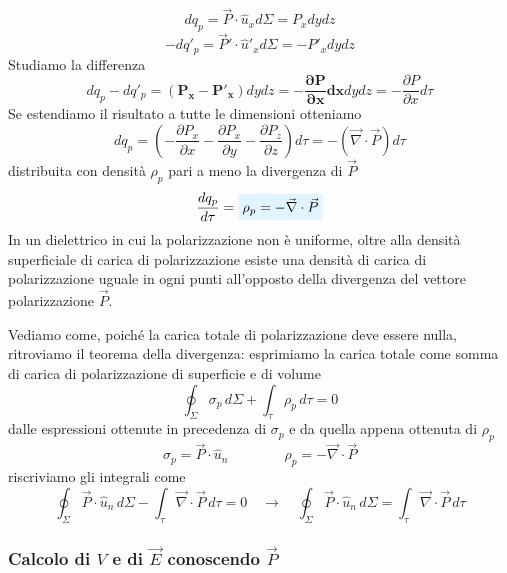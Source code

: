 \documentclass[x11names]{report}
\begin{document}
\begin{figure}[H]
	\centering
\end{figure}

\[
dq_p = \vec{P} \cdot \hat{u}_x d\Sigma = P_x dydz
\]
\[
-dq'_p = \vec{P}'\cdot \hat{u}'_x d\Sigma = -P'_x dydz
\]
Studiamo la differenza
\[
dq_p -dq'_p = \boldsymbol{(P_x - P'_x)}dydz = \boldsymbol{-\frac{\partial P}{\partial x} dx} dy dz = -\frac{\partial P}{\partial x}d\tau
\]
Se estendiamo il risultato a tutte le dimensioni otteniamo 
\[
dq_p = \left(-\frac{\partial P_x}{\partial x}-\frac{\partial P_x}{\partial y}-\frac{\partial P_z}{\partial z}\right)d\tau = -\left(\vec{\nabla}\cdot\vec{P}\right)d\tau
\]
distribuita con densità \(\rho_p\) pari a meno la divergenza di \(\vec{P}\)
\begin{equation}
	 \frac{dq_p}{d\tau} = \viola{\rho_p = -\vec{\nabla}\cdot\vec{P}}
\end{equation}
In un dielettrico in cui la polarizzazione non è uniforme, oltre alla densità superficiale di carica di polarizzazione esiste una densità di carica di polarizzazione uguale in ogni punti all'opposto della divergenza del vettore polarizzazione \(\vec{P}\).

Vediamo come, poiché la carica totale di polarizzazione deve essere nulla, ritroviamo il teorema della divergenza: esprimiamo la carica totale come somma di carica di polarizzazione di superficie e di volume
\[
\oint_\Sigma \sigma_p \, d\Sigma + \int_\tau \rho_p \, d\tau = 0
\]
dalle espressioni ottenute in precedenza di \(\sigma_p\) e da quella appena ottenuta di \(\rho_p\) 
\[
\sigma_p = \vec{P}\cdot\hat{u}_n \qquad \qquad \rho_p = - \vec{\nabla}\cdot\vec{P}
\]
riscriviamo gli integrali come
\[
\oint_\Sigma \vec{P}\cdot\hat{u}_n \, d\Sigma  - \int_\tau \vec{\nabla}\cdot\vec{P} \, d\tau = 0 \quad \to \quad \oint_\Sigma \vec{P}\cdot\hat{u}_n \, d\Sigma  = \int_\tau \vec{\nabla}\cdot\vec{P} \, d\tau
\]

\subsubsection{Calcolo di \(V\) e di \(\vec{E}\) conoscendo \(\vec{P}\)}
\end{document}
